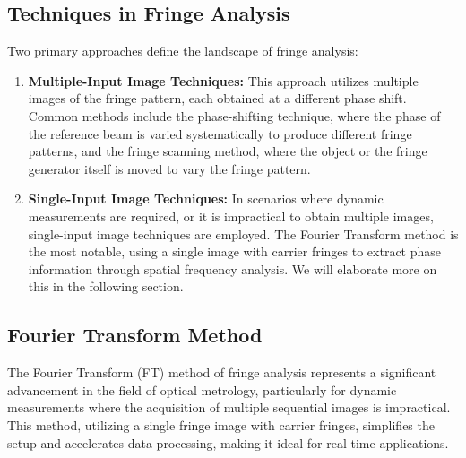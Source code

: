 \documentclass[../main.tex]{subfiles}
\begin{document}
\subsection{Techniques in Fringe Analysis}
\vspace{-8pt}
Two primary approaches define the landscape of fringe analysis:
\vspace{-4pt}
\begin{enumerate}
    \setlength{\itemsep}{0.1mm}
    \item \textbf{Multiple-Input Image Techniques:} This approach utilizes multiple images of the fringe pattern, each obtained at a different phase shift. Common methods include the phase-shifting technique, where the phase of the reference beam is varied systematically to produce different fringe patterns, and the fringe scanning method, where the object or the fringe generator itself is moved to vary the fringe pattern.
    \item \textbf{Single-Input Image Techniques:} In scenarios where dynamic measurements are required, or it is impractical to obtain multiple images, single-input image techniques are employed. The Fourier Transform method is the most notable, using a single image with carrier fringes to extract phase information through spatial frequency analysis. We will elaborate more on this in the following section.
\end{enumerate}

\subsection{Fourier Transform Method}
\vspace{-8pt}
The Fourier Transform (FT) method of fringe analysis represents a significant advancement in the field of optical metrology, particularly for dynamic measurements where the acquisition of multiple sequential images is impractical. This method, utilizing a single fringe image with carrier fringes, simplifies the setup and accelerates data processing, making it ideal for real-time applications.
\vspace{-8pt}
\end{document}
